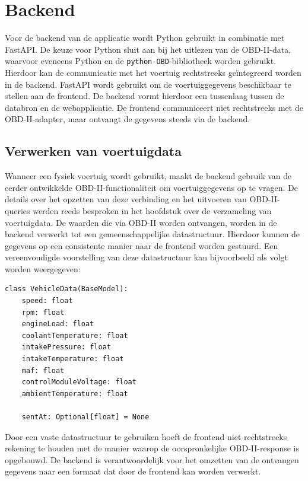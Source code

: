 \section{Backend}
Voor de backend van de applicatie wordt Python gebruikt in combinatie met FastAPI. De keuze voor Python sluit aan bij het uitlezen van de OBD-II-data, waarvoor eveneens Python en de \texttt{python-OBD}-bibliotheek worden gebruikt. Hierdoor kan de communicatie met het voertuig rechtstreeks geïntegreerd worden in de backend.
FastAPI wordt gebruikt om de voertuiggegevens beschikbaar te stellen aan de frontend. De backend vormt hierdoor een tussenlaag tussen de databron en de webapplicatie. De frontend communiceert niet rechtstreeks met de OBD-II-adapter, maar ontvangt de gegevens steeds via de backend.

\subsection{Verwerken van voertuigdata}
Wanneer een fysiek voertuig wordt gebruikt, maakt de backend gebruik van de eerder ontwikkelde OBD-II-functionaliteit om voertuiggegevens op te vragen. De details over het opzetten van deze verbinding en het uitvoeren van OBD-II-queries werden reeds besproken in het hoofdstuk over de verzameling van voertuigdata.
De waarden die via OBD-II worden ontvangen, worden in de backend verwerkt tot een gemeenschappelijke datastructuur. Hierdoor kunnen de gegevens op een consistente manier naar de frontend worden gestuurd.
Een vereenvoudigde voorstelling van deze datastructuur kan bijvoorbeeld als volgt worden weergegeven:

\begin{listing}[H]
\begin{verbatim}
class VehicleData(BaseModel):
    speed: float
    rpm: float
    engineLoad: float
    coolantTemperature: float
    intakePressure: float
    intakeTemperature: float
    maf: float
    controlModuleVoltage: float
    ambientTemperature: float

    sentAt: Optional[float] = None
\end{verbatim}
\caption{Gemeenschappelijk datamodel voor voertuiggegevens}
\label{lst:vehicle-data-model}
\end{listing}

Door een vaste datastructuur te gebruiken hoeft de frontend niet rechtstreeks rekening te houden met de manier waarop de oorspronkelijke OBD-II-response is opgebouwd. De backend is verantwoordelijk voor het omzetten van de ontvangen gegevens naar een formaat dat door de frontend kan worden verwerkt.

